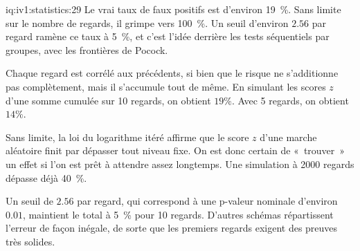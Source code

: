 \begin{solution}{iq:iv1:statistics:29}
Le vrai taux de faux positifs est d'environ 19~\%. Sans limite sur le nombre de regards, il grimpe vers 100~\%. Un seuil d'environ $2.56$ par regard ramène ce taux à 5~\%, et c'est l'idée derrière les tests séquentiels par groupes, avec les frontières de Pocock.

Chaque regard est corrélé aux précédents, si bien que le risque ne s'additionne pas complètement, mais il s'accumule tout de même. En simulant les scores $z$ d'une somme cumulée sur 10 regards, on obtient $19\%$. Avec 5 regards, on obtient $14\%$.

Sans limite, la loi du logarithme itéré affirme que le score $z$ d'une marche aléatoire finit par dépasser tout niveau fixe. On est donc certain de «~trouver~» un effet si l'on est prêt à attendre assez longtemps. Une simulation à 2000 regards dépasse déjà 40~\%.

Un seuil de $2.56$ par regard, qui correspond à une p-valeur nominale d'environ $0.01$, maintient le total à 5~\% pour 10 regards. D'autres schémas répartissent l'erreur de façon inégale, de sorte que les premiers regards exigent des preuves très solides.

\end{solution}

